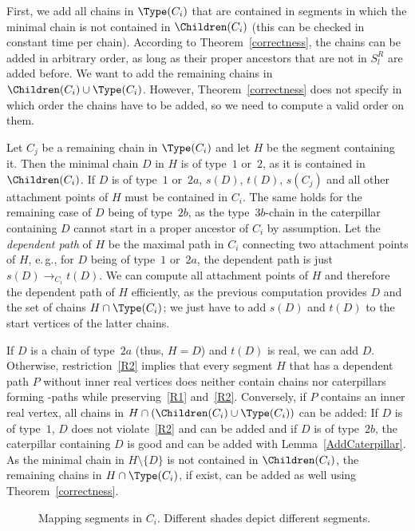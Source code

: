 First, we add all chains in $\Type(C_i)$ that are contained in segments in which the minimal chain is not contained in $\Children(C_i)$ (this can be checked in constant time per chain). According to Theorem~\ref{correctness}, the chains can be added in arbitrary order, as long as their proper ancestors that are not in $S^R_l$ are added before. We want to add the remaining chains in $\Children(C_i) \cup \Type(C_i)$. However, Theorem~\ref{correctness} does not specify in which order the chains have to be added, so we need to compute a valid order on them.

Let $C_j$ be a remaining chain in $\Type(C_i)$ and let $H$ be the segment containing it. Then the minimal chain $D$ in $H$ is of type~$1$ or~$2$, as it is contained in $\Children(C_i)$. If $D$ is of type~$1$ or~$2a$, $s(D)$, $t(D)$, $s(C_j)$ and all other attachment points of $H$ must be contained in $C_i$. The same holds for the remaining case of $D$ being of type~$2b$, as the type~$3b$-chain in the caterpillar containing $D$ cannot start in a proper ancestor of $C_i$ by assumption. Let the \emph{dependent path} of $H$ be the maximal path in $C_i$ connecting two attachment points of $H$, e.\,g., for $D$ being of type~$1$ or~$2a$, the dependent path is just $s(D) \rightarrow_{C_i} t(D)$. We can compute all attachment points of $H$ and therefore the dependent path of $H$ efficiently, as the previous computation provides $D$ and the set of chains $H \cap \Type(C_i)$; we just have to add $s(D)$ and $t(D)$ to the start vertices of the latter chains.

If $D$ is a chain of type~$2a$ (thus, $H=D$) and $t(D)$ is real, we can add $D$. Otherwise, restriction~\ref{R2} implies that every segment $H$ that has a dependent path $P$ without inner real vertices does neither contain chains nor caterpillars forming \BG-paths while preserving~\ref{R1} and~\ref{R2}. Conversely, if $P$ contains an inner real vertex, all chains in $H \cap (\Children(C_i) \cup \Type(C_i))$ can be added: If $D$ is of type~$1$, $D$ does not violate~\ref{R2} and can be added and if $D$ is of type~$2b$, the caterpillar containing $D$ is good and can be added with Lemma~\ref{AddCaterpillar}. As the minimal chain in $H \setminus \{D\}$ is not contained in $\Children(C_i)$, the remaining chains in $H \cap \Type(C_i)$, if exist, can be added as well using Theorem~\ref{correctness}.

\begin{wrapfigure}[16]{R}{7cm}
	\vspace{-0.5cm}
	\centering
\hspace{0.1cm}
	\caption{Mapping segments in $C_i$. Different shades depict different segments.}
	\label{fig:Mapping}
\end{wrapfigure}


